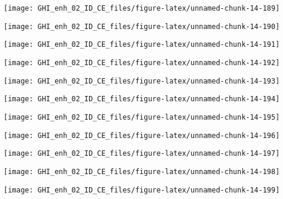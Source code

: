 \documentclass[
  10pt,
  a4paper,oneside]{article}
\begin{document}
\begin{center}\texttt{[image: GHI\_enh\_02\_ID\_CE\_files/figure-latex/unnamed-chunk-14-189]} \end{center}

\begin{center}\texttt{[image: GHI\_enh\_02\_ID\_CE\_files/figure-latex/unnamed-chunk-14-190]} \end{center}

\begin{center}\texttt{[image: GHI\_enh\_02\_ID\_CE\_files/figure-latex/unnamed-chunk-14-191]} \end{center}

\begin{center}\texttt{[image: GHI\_enh\_02\_ID\_CE\_files/figure-latex/unnamed-chunk-14-192]} \end{center}

\begin{center}\texttt{[image: GHI\_enh\_02\_ID\_CE\_files/figure-latex/unnamed-chunk-14-193]} \end{center}

\begin{center}\texttt{[image: GHI\_enh\_02\_ID\_CE\_files/figure-latex/unnamed-chunk-14-194]} \end{center}

\begin{center}\texttt{[image: GHI\_enh\_02\_ID\_CE\_files/figure-latex/unnamed-chunk-14-195]} \end{center}

\begin{center}\texttt{[image: GHI\_enh\_02\_ID\_CE\_files/figure-latex/unnamed-chunk-14-196]} \end{center}

\begin{center}\texttt{[image: GHI\_enh\_02\_ID\_CE\_files/figure-latex/unnamed-chunk-14-197]} \end{center}

\begin{center}\texttt{[image: GHI\_enh\_02\_ID\_CE\_files/figure-latex/unnamed-chunk-14-198]} \end{center}

\begin{center}\texttt{[image: GHI\_enh\_02\_ID\_CE\_files/figure-latex/unnamed-chunk-14-199]} \end{center}
\end{document}
